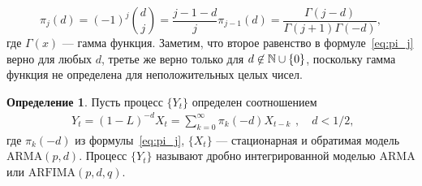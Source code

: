 \documentclass[specialist,
substylefile = spbu_report.rtx,
subf,href,colorlinks=true, 12pt]{disser}
\theoremstyle{definition}
\newtheorem{definition}{Определение}[section]
\newtheorem{remark}{Замечание}[section]
\newtheorem{assumption}{Предположение}[section]
\begin{document}
\begin{equation}\label{eq:pi_j}
	\pi_j(d)=(-1)^j\binom{d}{j}=\frac{j-1-d}{j}\pi_{j-1}(d)=\frac{\Gamma(j-d)}{\Gamma(j+1)\Gamma(-d)},
\end{equation}
где $\Gamma(x)$ --- гамма функция. Заметим, что второе равенство в формуле~\eqref{eq:pi_j} верно для любых $d$, третье же верно только для $d\not\in\mathbb{N}\cup\{0\}$, поскольку гамма функция не определена для неположительных целых чисел.
\begin{definition}\label{def:arfima}
	Пусть процесс $\{Y_t\}$ определен соотношением
	\[
		\begin{aligned}
			Y_t=(1-L)^{-d}X_t=\sum_{k=0}^\infty \pi_k(-d)X_{t-k}
		\end{aligned},\quad d<1/2,
	\]
	где $\pi_k(-d)$ из формулы~\eqref{eq:pi_j}, $\{X_t\}$ --- стационарная и обратимая модель $\mathrm{ARMA}(p, d)$. Процесс $\{Y_t\}$ называют дробно интегрированной моделью $\mathrm{ARMA}$ или $\mathrm{ARFIMA}(p, d, q)$.
\end{definition}
\end{document}
